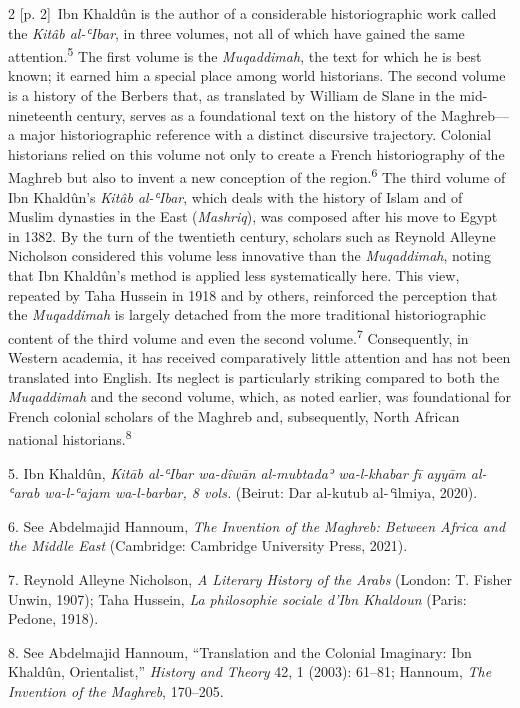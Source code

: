\documentclass[10pt,a4paper]{article}
\begin{document}
\begin{paracol}{2}
{\scriptsize\color{gray} [p. 2]}\ Ibn Khaldûn is the author of a considerable historiographic work called the \textit{Kitâb al-ʿIbar}, in three volumes, not all of which have gained the same attention.\nobreak\textsuperscript{5} The first volume is the \textit{Muqaddimah}, the text for which he is best known; it earned him a special place among world historians. The second volume is a history of the Berbers that, as translated by William de Slane in the mid-nineteenth century, serves as a foundational text on the history of the Maghreb—a major historiographic reference with a distinct discursive trajectory. Colonial historians relied on this volume not only to create a French historiography of the Maghreb but also to invent a new conception of the region.\nobreak\textsuperscript{6} The third volume of Ibn Khaldûn’s \textit{Kitâb al-ʿIbar}, which deals with the history of Islam and of Muslim dynasties in the East (\textit{Mashriq}), was composed after his move to Egypt in 1382. By the turn of the twentieth century, scholars such as Reynold Alleyne Nicholson considered this volume less innovative than the \textit{Muqaddimah}, noting that Ibn Khaldûn’s method is applied less systematically here. This view, repeated by Taha Hussein in 1918 and by others, reinforced the perception that the \textit{Muqaddimah} is largely detached from the more traditional historiographic content of the third volume and even the second volume.\nobreak\textsuperscript{7} Consequently, in Western academia, it has received comparatively little attention and has not been translated into English. Its neglect is particularly striking compared to both the \textit{Muqaddimah} and the second volume, which, as noted earlier, was foundational for French colonial scholars of the Maghreb and, subsequently, North African national historians.\nobreak\textsuperscript{8}\par{\small 5. Ibn Khaldûn, \textit{Kitāb al-ʿIbar wa-dîwān al-mubtadaʾ wa-l-khabar fī ayyām al-ʿarab wa-l-ʿajam wa-l-barbar, 8 vols.} (Beirut: Dar al-kutub al-\textit{ʿ}ilmiya, 2020).\par}{\small 6. See Abdelmajid Hannoum, \textit{The Invention of the Maghreb: Between Africa and the Middle East} (Cambridge: Cambridge University Press, 2021).\par}{\small 7. Reynold Alleyne Nicholson, \textit{A Literary History of the Arabs} (London: T. Fisher Unwin, 1907); Taha Hussein, \textit{La philosophie sociale d’Ibn Khaldoun} (Paris: Pedone, 1918).\par}{\small 8. See Abdelmajid Hannoum, “Translation and the Colonial Imaginary: Ibn Khaldûn, Orientalist,” \textit{History and Theory} 42, 1 (2003): 61–81; Hannoum, \textit{The Invention of the Maghreb}, 170–205.\par}

\end{paracol}
\end{document}
